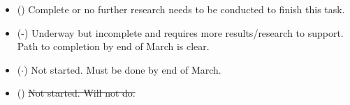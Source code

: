 \begin{itemize}
    \item (\checkmark)  Complete or no further research needs to be conducted to finish this task.
    \item (\checkmark-)  Underway but incomplete and requires more results/research to support.  Path to completion by end of March is clear.
    \item ($\cdot$)  Not started.  Must be done by end of March.
    \item (\xmark)  \sout{Not started.  Will not do.}
\end{itemize}

\listoffigures

\listoftables

\pagebreak
